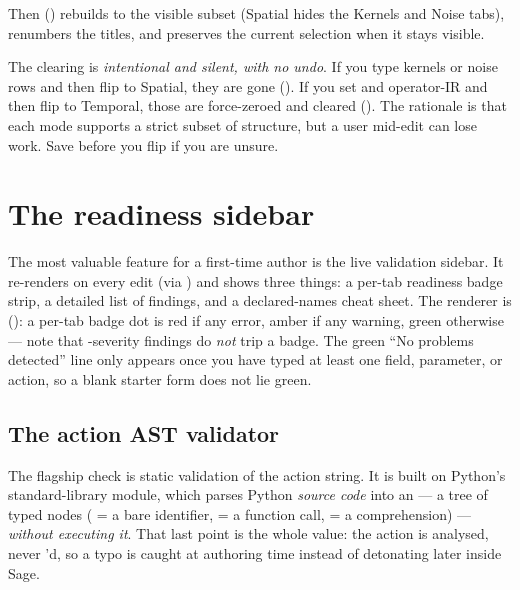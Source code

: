 Then  () rebuilds
 to the visible subset (Spatial hides the Kernels and
Noise tabs), renumbers the titles, and preserves the current selection when it
stays visible.

\begin{gotcha}
The clearing is \emph{intentional and silent, with no undo}. If you type kernels
or noise rows and then flip to Spatial, they are gone ().
If you set  and operator-IR and then flip to Temporal, those are
force-zeroed and cleared (). The rationale is that
each mode supports a strict subset of structure, but a user mid-edit can lose work.
Save before you flip if you are unsure.
\end{gotcha}

\section{The readiness sidebar}

The most valuable feature for a first-time author is the live validation sidebar.
It re-renders on every edit (via ) and shows three things: a
per-tab readiness badge strip, a detailed list of findings, and a declared-names
cheat sheet. The renderer is 
(): a per-tab badge dot is red if any error, amber
if any warning, green otherwise --- note that -severity findings do
\emph{not} trip a badge. The green ``No problems detected'' line only appears
once you have typed at least one field, parameter, or action, so a blank starter
form does not lie green.

\subsection{The action AST validator}

The flagship check is static validation of the action string. It is built on
Python's standard-library  module, which parses Python \emph{source code}
into an  --- a tree of typed nodes ( = a
bare identifier,  = a function call,  = a
 comprehension) --- \emph{without executing it}. That last
point is the whole value: the action is analysed, never 'd, so a typo is
caught at authoring time instead of detonating later inside Sage.

